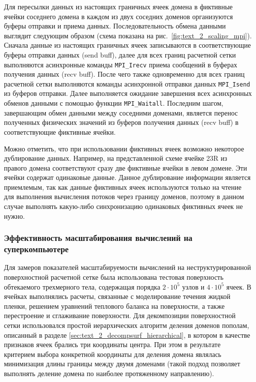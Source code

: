 Для пересылки данных из настоящих граничных ячеек домена в фиктивные ячейки соседнего домена в каждом из двух соседних доменов организуются буферы отправки и приема данных.
Последовательность обмена данными выглядит следующим образом (схема показана на рис.~\ref{fig:text_2_scaling_mpi}).
Сначала данные из настоящих граничных ячеек записываются в соответствующие буферы отправки данных (send buff), далее для всех границ расчетной сетки выполняются асинхронные команды \texttt{MPI\_Irecv} приема сообщений в буферах получения данных (recv buff).
После чего также одновременно для всех границ расчетной сетки выполняются команды асинхронной отправки данных \texttt{MPI\_Isend} из буферов отправки.
Далее выполняется ожидание завершения всех асинхронных обменов данными с помощью функции \texttt{MPI\_Waitall}.
Последним шагом, завершающим обмен данными между соседними доменами, является перенос полученных физических значений из буферов получения данных (recv buff) в соответствующие фиктивные ячейки.

Можно отметить, что при использовании фиктивных ячеек возможно некоторое дублирование данных.
Например, на представленной схеме ячейке 23R из правого домена соответствуют сразу две фиктивные ячейки в левом домене.
Эти ячейки содержат одинаковые данные.
Данное дублирование информации является приемлемым, так как данные фиктивных ячеек используются только на чтение для выполнения вычисления потоков через границу доменов, поэтому в данном случае выполнять какую-либо синхронизацию одинаковых фиктивных ячеек не нужно.

\subsubsection{Эффективность масштабирования вычислений на суперкомпьютере}

Для замеров показателей масштабируемости вычислений на неструктурированной поверхностной расчетной сетке была использована тестовая поверхность обтекаемого трехмерного тела, содержащая порядка $2 \cdot 10^5$ узлов и $4 \cdot 10^5$ ячеек.
В ячейках выполнялись расчеты, связанные с моделирование течения жидкой пленки, решением уравнений теплового баланса на поверхности, а также перестроение и сглаживание поверхности.
Для декомпозиции поверхностной сетки использовался простой иерархических алгоритм деления доменов пополам, описанный в разделе \ref{sec:text_2_decompsurf_hierarchical}, в котором в качестве признаков ячеек брались три координаты центра.
При этом в результате критерием выбора конкретной координаты для деления домена являлась минимизация длины границы между двумя доменами (такой подход позволяет выполнять деление домена по наиболее протяженному направлению).

